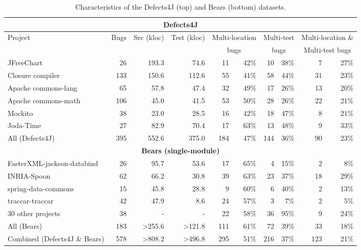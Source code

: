 \documentclass[sigconf, timestamp-false, anonymous=true]{acmart}
\begin{document}
\begin{table*}
\begin{center}
\begin{tabular}{l | rrr  | rr | rr | rr}
\toprule
\multicolumn{10}{c}{\textbf{Defects4J}} \\
\midrule
Project & Bugs & Src (kloc) & Test (kloc) & \multicolumn{2}{c}{Multi-location} 
		& \multicolumn{2}{c}{Multi-test} & \multicolumn{2}{c}{Multi-location \&}\\
&&&&\multicolumn{2}{c}{bugs}&\multicolumn{2}{c}{bugs}&\multicolumn{2}{c}{Multi-test bugs}\\
\midrule
JFreeChart  & 26 & 193.3 & 74.6  & 11 & 42\% & 10 & 38\% & 7 & 27\%\\
Closure compiler & 133 & 150.6 & 112.6 & 55 & 41\% & 58 & 44\% & 31 & 23\%\\
Apache commons-lang & 65 & 57.8 & 47.4  & 32 & 49\% & 17 & 26\% & 13 & 20\%\\
Apache commons-math & 106 & 45.0 & 41.5 & 53 & 50\% & 28 & 26\% & 22 & 21\%\\
Mockito & 38 & 23.0 & 28.5 & 16 & 42\% & 18 & 47\% & 8 & 21\%\\
Joda-Time & 27 & 82.9 & 70.4 & 17 & 63\% & 13 & 48\% & 9 & 33\%\\
\midrule
All (Defects4J) & 395 & 552.6 & 375.0 & 184 & 47\% & 144 & 36\% & 90 & 23\%\\
\midrule
\multicolumn{10}{c}{\textbf{Bears (single-module)}} \\
\midrule
FasterXML-jackson-databind & 26 & 95.7 & 53.6 & 17 & 65\% & 4 & 15\% & 2 & 8\%\\
INRIA-Spoon & 62 & 66.2 & 30.8  & 39 & 63\% & 23 & 37\% & 18 & 29\%\\
spring-data-commons & 15 & 45.8 & 28.8  & 9 & 60\% & 6 & 40\% & 2 & 13\%\\
traccar-traccar & 42 & 47.9 & 8.6 & 24 & 57\% & 3 & 7\% & 2 & 5\%\\
30 other projects & 38 & - & - & 22 & 58\% & 36 & 95\% & 9 & 24\%\\
\midrule
All (Bears) & 183 & >255.6 & >121.8 & 111 & 61\% & 72 & 39\% & 33 & 18\% \\
\midrule
Combined (Defects4J \& Bears) & 578 & >808.2 & >496.8 & 295 & 51\% & 216 & 37\% & 123 & 21\%\\
\bottomrule
\end{tabular}
\end{center}
\caption{\label{tab:dataset-characteristics} Characteristics of the Defects4J (top) and Bears (bottom) datasets.}
\end{table*}
\end{document}
